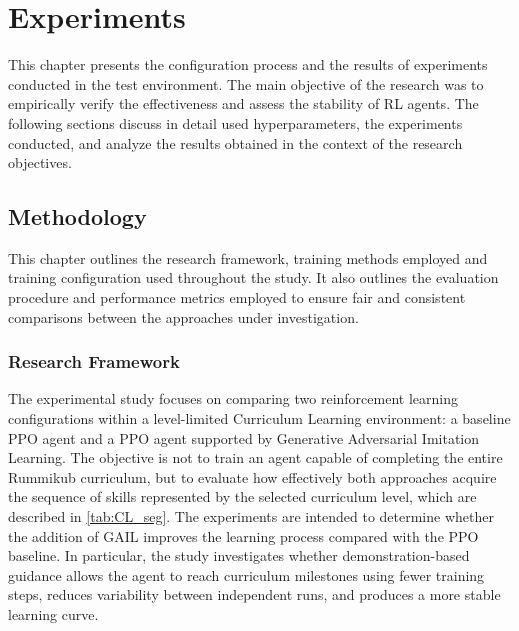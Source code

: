 \newcommand{\figureplaceholder}[2][0.9\textwidth]{%
	\fbox{%
		\begin{minipage}[c][6cm][c]{#1}
			\centering
			\textcolor{gray}{\large #2}
		\end{minipage}%
	}%
}
\chapter{Experiments}
\label{chapt::Experiments}
%
%
%
This chapter presents the configuration process and the results of experiments conducted in the test environment. The main objective of the research was to empirically verify the effectiveness and assess the stability of RL agents. The following sections discuss in detail used hyperparameters, the experiments conducted, and analyze the results obtained in the context of the research objectives.
\section{Methodology}
This chapter outlines the research framework, training methods employed and training configuration used throughout the study. It also outlines the evaluation procedure and performance metrics employed to ensure fair and consistent comparisons between the approaches under investigation.
\subsection{Research Framework}

The experimental study focuses on comparing two reinforcement learning configurations within a level-limited Curriculum Learning environment: a baseline PPO agent and a PPO agent supported by Generative Adversarial Imitation Learning. The objective is not to train an agent capable of completing the entire Rummikub curriculum, but to evaluate how effectively both approaches acquire the sequence of skills represented by the selected curriculum level, which are described in \ref{tab:CL_seg}.
The experiments are intended to determine whether the addition of GAIL improves the learning process compared with the PPO baseline. In particular, the study investigates whether demonstration-based guidance allows the agent to reach curriculum milestones using fewer training steps, reduces variability between independent runs, and produces a more stable learning curve.

